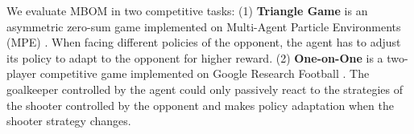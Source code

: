 \documentclass{article}
\begin{document}

We evaluate MBOM in two competitive tasks: (1) \textbf{Triangle Game} is an asymmetric zero-sum game implemented on Multi-Agent Particle Environments (MPE) \citep{lowe2017multi}. When facing different policies of the opponent, the agent has to adjust its policy to adapt to the opponent for higher reward. (2) \textbf{One-on-One} is a two-player competitive game implemented on Google Research Football  \citep{kurach2020google}. The goalkeeper controlled by the agent could only passively react to the strategies of the shooter controlled by the opponent and makes policy adaptation when the shooter strategy changes. 


\end{document}
